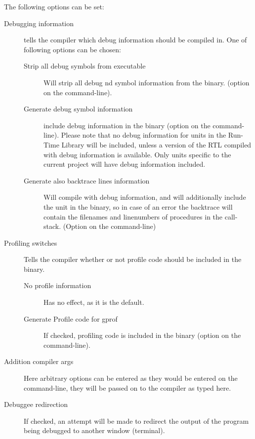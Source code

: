 The following options can be set:
\begin{description}
\item[Debugging information] tells the compiler which debug information
should be compiled in. One of following options can be chosen:
\begin{description}
\item[Strip all debug symbols from executable] Will strip all debug nd
symbol information from the binary. (option  on the command-line).
\item[Generate debug symbol information] include debug information in the
binary (option  on the command-line). Please note that no debug
information for units in the Run-Time Library will be included, unless a 
version of the RTL compiled with debug information is available. Only units
specific to the current project will have debug information included.
\item[Generate also backtrace lines information] Will compile with debug
information, and will additionally include the  unit in the
binary, so in case of an error the backtrace will contain the filenames and
linenumbers of procedures in the call-stack. (Option  on the
command-line)
\end{description}
\item[Profiling switches] Tells the compiler whether or not profile code
should be included in the binary.
\begin{description}
\item[No profile information] Has no effect, as it is the default.
\item[Generate Profile code for gprof] If checked, profiling code is
included in the binary (option  on the command-line).
\end{description}
\item[Addition compiler args] Here arbitrary options can be entered as they
would be entered on the command-line, they will be passed on to the compiler
as typed here.
\item[Debuggee redirection]
If checked, an attempt will be made to redirect the output of the program
being debugged to another window (terminal). 
\end{description}
 
%
%
